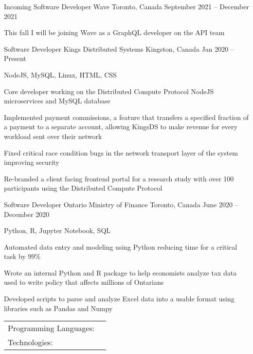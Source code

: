 \documentclass[]{awesome-cv}
\begin{document}
\vspace{-2mm}
\begin{cventries}
	\cventry
	{Incoming Software Developer}
	{Wave}
	{Toronto, Canada}
	{September 2021 – December 2021}
	{\begin{cvitems}
		\item {This fall I will be joining Wave as a GraphQL developer on the API team}
		\end{cvitems}}
  \cventry
	{Software Developer}
	{Kings Distributed Systems}
	{Kingston, Canada}
	{Jan 2020 – Present}
	{\begin{cvitems}
		\item {NodeJS, MySQL, Linux, HTML, CSS}
    \item {Core developer working on the Distributed Compute Protocol NodeJS microservices and MySQL database}
		\item {Implemented payment commissions, a feature that transfers a specified fraction of a payment to a separate account, allowing KingsDS to make revenue for every workload sent over their network}
		\item {Fixed critical race condition bugs in the network transport layer of the system improving security}
		\item {Re-branded a client facing frontend portal for a research study with over 100 participants using the Distributed Compute Protocol}
		\end{cvitems}}
	\cventry
	{Software Developer}
	{Ontario Ministry of Finance}
	{Toronto, Canada}
	{June 2020 – December 2020}
	{\begin{cvitems}
		\item {Python, R, Jupyter Notebook, SQL}
		\item {Automated data entry and modeling using Python reducing time for a critical task by 99\%}
		\item {Wrote an internal Python and R package to help economists analyze tax data used to write policy that affects millions of Ontarians}
		\item {Developed scripts to parse and analyze Excel data into a usable format using libraries such as Pandas and Numpy}
		\end{cvitems}}
\end{cventries}
\begin{cventries}
	\cventry
	{}
	{\def\arraystretch{1.15}{\begin{tabular}{ l l }
		Programming Languages:  & {\skill{ JavaScript, C, Python, Kotlin, Java, Shell / Bash, SQL, R, Perl}} \\
		Technologies:  & {\skill{ Node.js, Linux / Unix, Android Studio, Linux Containers, Express.js, Tensorflow}} \\
		\end{tabular}}}
	{}
	{}
	{}
\end{cventries}
\end{document}
